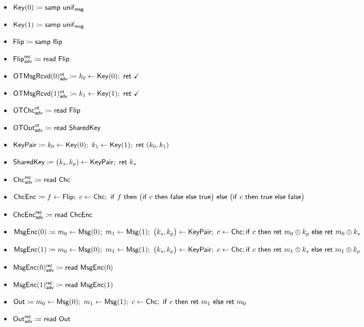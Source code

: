 \begin{itemize}
\item {\color{red} $\mathsf{Key}(0) \coloneqq \mathsf{samp} \ \mathsf{unif}_{\mathsf{msg}}$}
\item {\color{red} $\mathsf{Key}(1) \coloneqq \mathsf{samp} \ \mathsf{unif}_{\mathsf{msg}}$}
\item $\mathsf{Flip} \coloneqq \mathsf{samp} \ \mathsf{flip}$
\item {\color{blue} $\mathsf{Flip}^{\mathsf{rec}}_{\mathsf{adv}} \coloneqq \mathsf{read} \ \mathsf{Flip}$}
\item {\color{blue} $\LeakOTMsgRcvd(0)^\ot_\adv \coloneqq k_0 \leftarrow \Key(0); \ \ret{\checkmark}$}
\item {\color{blue} $\LeakOTMsgRcvd(1)^\ot_\adv \coloneqq k_1 \leftarrow \Key(1); \ \ret{\checkmark}$}
\item {\color{blue} $\mathsf{OTChc}^{\mathsf{ot}}_{\mathsf{adv}} \coloneqq \mathsf{read} \ \mathsf{Flip}$}
\item {\color{blue} $\mathsf{OTOut}^{\mathsf{ot}}_{\mathsf{adv}} \coloneqq \mathsf{read} \ \mathsf{SharedKey}$}
\item {\color{red} $\KeyPair \coloneqq k_0 \leftarrow \Key(0); \ k_1 \leftarrow \Key(1); \ \ret{(k_0,k_1)}$}
\item $\mathsf{SharedKey} \coloneqq \big(k_s,k_p) \leftarrow \mathsf{KeyPair}; \ \mathsf{ret} \ k_s$
\item {\color{blue} $\mathsf{Chc}^{\mathsf{rec}}_{\mathsf{adv}} \coloneqq \mathsf{read} \ \mathsf{Chc}$}
\item $\ChcEnc \coloneqq f \leftarrow \Flip; \ c \leftarrow \Chc; \ \ifte{f}{\big(\ifte{c}{\false}{\true}\big)}{\big(\ifte{c}{\true}{\false}\big)}$
\item {\color{blue} $\mathsf{ChcEnc}^{\mathsf{rec}}_{\mathsf{adv}} \coloneqq \mathsf{read} \ \mathsf{ChcEnc}$}
\item $\mathsf{MsgEnc}(0) \coloneqq m_0 \leftarrow \mathsf{Msg}(0); \ m_1 \leftarrow \mathsf{Msg}(1); \ \big(k_s,k_p\big) \leftarrow \mathsf{KeyPair}; \ c \leftarrow \mathsf{Chc}; \\ \mathsf{if} \ c \ \mathsf{then} \ \mathsf{ret} \ m_0 \oplus k_p \ \mathsf{else} \ \mathsf{ret} \ m_0 \oplus k_s$
\item $\mathsf{MsgEnc}(1) \coloneqq m_0 \leftarrow \mathsf{Msg}(0); \ m_1 \leftarrow \mathsf{Msg}(1); \ \big(k_s,k_p\big) \leftarrow \mathsf{KeyPair}; \ c \leftarrow \mathsf{Chc}; \\ \mathsf{if} \ c \ \mathsf{then} \ \mathsf{ret} \ m_1 \oplus k_s \ \mathsf{else} \ \mathsf{ret} \ m_1 \oplus k_p$
\item {\color{blue} $\mathsf{MsgEnc}(0)^{\mathsf{rec}}_{\mathsf{adv}} \coloneqq \mathsf{read} \ \mathsf{MsgEnc}(0)$}
\item {\color{blue} $\mathsf{MsgEnc}(1)^{\mathsf{rec}}_{\mathsf{adv}} \coloneqq \mathsf{read} \ \mathsf{MsgEnc}(1)$}
\item $\Out \coloneqq m_0 \leftarrow \Msg(0); \ m_1 \leftarrow \Msg(1); \ c \leftarrow \Chc; \ \ifte{c}{\ret{m_1}}{\ret{m_0}}$
\item {\color{blue} $\mathsf{Out}^{\mathsf{rec}}_{\mathsf{adv}} \coloneqq \mathsf{read} \ \mathsf{Out}$}
\end{itemize}

